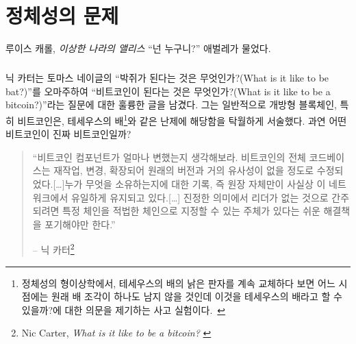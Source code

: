 \chapter{정체성의 문제}
\label{les:4}

\begin{chapquote}{루이스 캐롤, \textit{이상한 나라의 앨리스}}
	\enquote{넌 누구니?} 애벌레가 물었다.
\end{chapquote}

\paragraph{}
닉 카터는 토마스 네이글의 \enquote{박쥐가 된다는 것은 무엇인가?(What is it like to be bat?)}를 오마주하여 
\enquote{비트코인이 된다는 것은 무엇인가?(What is it like to be a bitcoin?)}라는 질문에 대한 훌륭한 글을 남겼다. 
그는 일반적으로 개방형 블록체인, 특히 비트코인은, 
테세우스의 배\footnote{정체성의 형이상학에서, 테세우스의 배의 낡은 판자를 계속 교체하다 보면 어느 시점에는 원래 배 조각이 하나도 남지 않을 것인데 이것을 테세우스의 배라고 할 수 있을까?에 대한
의문을 제기하는 사고 실험이다.~\cite{wiki:theseus}}와 같은 난제에 해당함을 탁월하게 서술했다.
과연 어떤 비트코인이 진짜 비트코인일까?

\begin{quotation}\begin{samepage}
		\enquote{비트코인 컴포넌트가 얼마나 변했는지 생각해보라. 
			비트코인의 전체 코드베이스는 재작업, 변경, 확장되어
			원래의 버전과 거의 유사성이 없을 정도로 수정되었다.[\ldots]누가 무엇을 소유하는지에 대한
			기록, 즉 원장 자체만이 사실상 이 네트워크에서 유일하게 유지되고 있다.[\ldots]
			진정한 의미에서 리더가 없는 것으로 간주되려면 
			특정 체인을 적법한 체인으로 지정할 수 있는 주체가 있다는 쉬운 해결책을 포기해야만 한다.}
		\begin{flushright} -- 닉 카터\footnote{Nic Carter, \textit{What is it like to be a bitcoin?} \cite{bitcoin-identity}}
\end{flushright}\end{samepage}\end{quotation}

